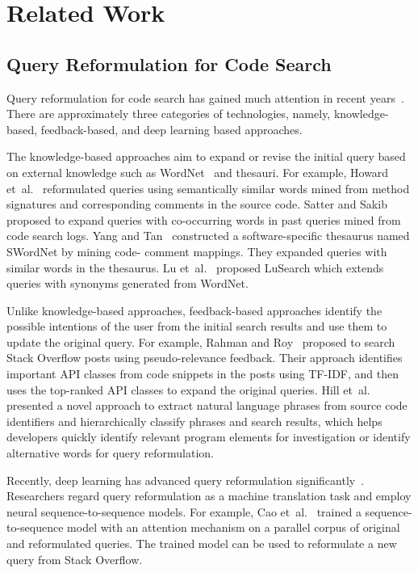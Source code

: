 \documentclass[sigconf,screen]{acmart}
\newcommand{\etal}{\hbox{et al.}\xspace}
\begin{document}
\section{Related Work}
\subsection{Query Reformulation for Code Search}
Query reformulation for code search has gained much attention in recent years~\cite{sesimilarwords, co-occurrence, SWordNet, nlp2api, pseudo, lusearch}. There are approximately three categories of technologies, namely, knowledge-based, feedback-based, and deep learning based approaches.

The knowledge-based approaches aim to expand or revise the initial query based on external knowledge such as WordNet~\cite{WordNet} and thesauri. 
For example, Howard \etal~\cite{sesimilarwords} reformulated queries using semantically similar words mined from method signatures and corresponding comments in the source code. Satter and Sakib~\cite{co-occurrence} proposed to expand queries with co-occurring words in past queries mined from code search logs. Yang and Tan~\cite{SWordNet} constructed a software-specific thesaurus named SWordNet by mining code- comment mappings. They expanded queries with similar words in the thesaurus. Lu \etal~\cite{lusearch} proposed LuSearch which extends queries with synonyms generated from WordNet.

Unlike knowledge-based approaches, feedback-based approaches identify the possible intentions of the user from the initial search results and use them to update the original query. 
For example, Rahman and Roy~\cite{nlp2api} proposed to search Stack Overflow posts using pseudo-relevance feedback. Their approach identifies important API classes from code snippets in the posts using TF-IDF, and then uses the top-ranked API classes to expand the original queries. Hill \etal~\cite{pseudo} presented a novel approach to extract natural language phrases from source code identifiers and hierarchically classify phrases and search results, which helps developers quickly identify relevant program elements for investigation or identify alternative words for query reformulation.

Recently, deep learning has advanced query reformulation significantly~\cite{sequer, seq2seqOfBugReport}. Researchers regard query reformulation as a machine translation task and employ neural sequence-to-sequence models. 
For example, Cao \etal~\cite{sequer} trained a sequence-to-sequence model with an attention mechanism on a parallel corpus of original and reformulated queries. The trained model can be used to reformulate a new query from Stack Overflow. %
\end{document}
